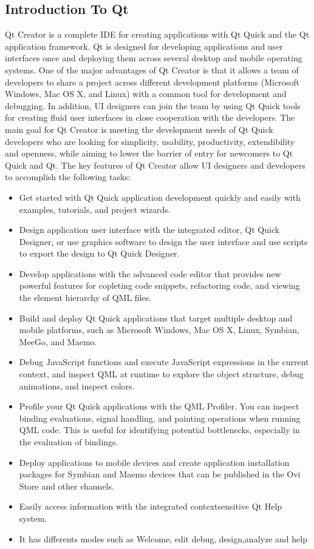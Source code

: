 \subsection{Introduction To Qt}
\noindent Qt Creator is a complete IDE for creating applications with Qt Quick and the Qt application framework. Qt is designed for developing applications and user interfaces once and deploying them across several desktop and mobile operating systems. One of the major advantages of Qt Creator is that it allows a team of developers to share a project across different development platforms (Microsoft Windows, Mac OS X, and Linux) with a common tool for development and debugging.
In addition, UI designers can join the team by using Qt Quick tools for creating fluid user interfaces in close cooperation with the developers. The main goal for Qt Creator is meeting the development needs of Qt Quick developers who are looking for simplicity, usability, productivity, extendibility and openness, while aiming to lower the barrier of entry for newcomers to Qt Quick and Qt. The key features of Qt Creator allow UI designers and developers to accomplish the following tasks:
\begin{itemize}
\item Get  started  with  Qt  Quick  application  development  quickly  and  easily  with  examples,  tutorials,
and project wizards.
\item Design  application  user  interface  with  the  integrated  editor,  Qt  Quick  Designer,  or  use graphics
software to design the user interface and use scripts to export the design to Qt Quick Designer.
\item Develop  applications   with  the   advanced  code  editor  that  provides  new  powerful  features  for
copleting code snippets, refactoring code, and viewing the element hierarchy of QML files.
\item Build  and  deploy  Qt  Quick  applications  that  target  multiple  desktop and mobile platforms, such
as Microsoft Windows, Mac OS X, Linux, Symbian, MeeGo, and Maemo.
\item Debug  JavaScript  functions  and  execute  JavaScript  expressions  in  the  current  context,   and
inspect QML at runtime to explore the object structure, debug animations, and inspect colors.
\item Profile  your  Qt  Quick  applications  with  the  QML  Profiler.  You can inspect binding evaluations,
signal  handling,  and  painting  operations  when  running  QML  code.  This  is  useful  for  identifying
potential bottlenecks, especially in the evaluation of bindings.
\item Deploy  applications  to  mobile  devices  and  create  application  installation  packages  for  Symbian
and Maemo devices that can be published in the Ovi Store and other channels.
\item Easily access information with the integrated context­sensitive Qt Help system.
\item It has differents modes such as Welcome, edit debug, design,analyze and help
\end{itemize}

